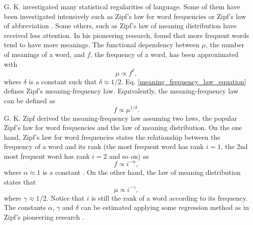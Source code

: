 \documentclass{article}
\begin{document}
% 

G. K.  investigated many statistical regularities of language. Some of them have been investigated intensively such as Zipf's law for word frequencies \cite{Fedorowicz1982a, Ferrer2009a, Font2013a, Ferrer2016b} or Zipf's law of abbreviation \cite{Strauss2006a, Ferrer2012d}. 
Some others, such as Zipf's law of meaning distribution have received less attention.  
In his pioneering research,  found that more frequent words tend to have more meanings. The functional dependency between $\mu$, the number of meanings of a word, and $f$, the frequency of a word, has been approximated with \cite{Ilgen2007a, Baayen2005a, Zipf1945a}
\begin{equation}
\mu \propto f^{\delta},
\label{meaning_frequency_law_equation}
\end{equation}
where $\delta$ is a constant such that $\delta \approx 1/2$. Eq. \ref{meaning_frequency_law_equation} defines Zipf's meaning-frequency law.
Equivalently, the meaning-frequency law can be defined as
\begin{equation}
f \propto \mu^{1/\delta}.
\label{mirror_meaning_frequency_law_equation}
\end{equation}
G. K. Zipf derived the meaning-frequency law assuming two laws, the popular Zipf's law for word frequencies and the law of meaning distribution. On the one hand, Zipf's law for word frequencies states the relationship between the frequency of a word and its rank (the most frequent word has rank $i=1$, the 2nd most frequent word has rank $i=2$ and so on) as  
\begin{equation}
f \propto i^{-\alpha},
\label{frequency_rank_law_equation}
\end{equation}
where $\alpha \approx 1$ is a constant \cite{Zipf1945a,Zipf1949a}. On the other hand, the law of meaning distribution \cite{Zipf1945a,Zipf1949a} states that
\begin{equation}
\mu \propto i^{-\gamma},
\label{law_of_meaning_distribution_equation}
\end{equation}
where $\gamma \approx 1/2$. Notice that $i$ is still the rank of a word according to its frequency.
The constants $\alpha$, $\gamma$ and $\delta$ can be estimated applying some regression method as in Zipf's pioneering research \cite{Zipf1945a,Zipf1949a}.
\end{document}
